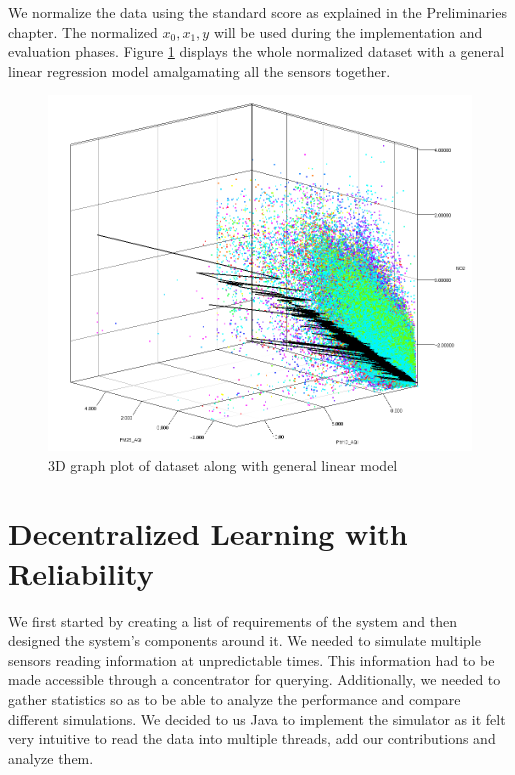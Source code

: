 \documentclass{mproj}
\begin{document}
We normalize the data using the standard score as explained in the Preliminaries chapter. The normalized $x_0,x_1,y$ will be used during the implementation and evaluation phases. Figure \ref{fig:dataset} displays the whole normalized dataset with a general linear regression model amalgamating all the sensors together.

\begin{figure}[H]
\caption{3D graph plot of dataset along with general linear model}
\label{fig:dataset}
\centerline{\includegraphics[scale=0.6]{dataset}}
\end{figure}

\section{Decentralized Learning with Reliability}
We first started by creating a list of requirements of the system and then designed the system's components around it. We needed to simulate multiple sensors reading information at unpredictable times. This information had to be made accessible through a concentrator for querying. Additionally, we needed to gather statistics so as to be able to analyze the performance and compare different simulations. We decided to us Java to implement the simulator as it felt very intuitive to read the data into multiple threads, add our contributions and analyze them.
\end{document}
